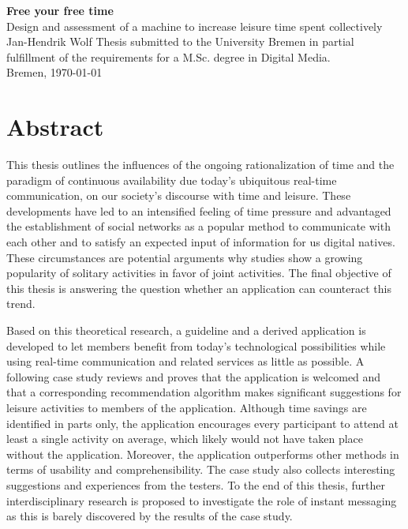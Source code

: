 \documentclass[12pt,numbers=noenddot,parskip,bibliography=totocnumbered,listof=totocnumbered,draft]{scrreprt}
\begin{document}
\begin{titlepage}
\null
\vfill

\Huge\textbf{Free your free time}
\bigskip\\
\LARGE{Design and assessment of a machine to increase leisure time spent collectively} %
\medskip\\
\Large{Jan-Hendrik Wolf}
\vfill
\vfill
\vfill
\small{Thesis submitted to the University Bremen in partial fulfillment of the requirements for a M.Sc. degree in Digital Media.\\
Bremen, \today}
\end{titlepage}


\tableofcontents

\chapter*{Abstract}
This thesis outlines the influences of the ongoing rationalization of time and the paradigm of continuous availability due today's ubiquitous real-time communication, on our society's discourse with time and leisure. These developments have led to an intensified feeling of time pressure and advantaged the establishment of social networks as a popular method to communicate with each other and to satisfy an expected input of information for us digital natives. These circumstances are potential arguments why studies show a growing popularity of solitary activities in favor of joint activities. The final objective of this thesis is answering the question whether an application can counteract this trend. 

Based on this theoretical research, a guideline and a derived application is developed to let members benefit from today's technological possibilities while using real-time communication and related services as little as possible. A following case study reviews and proves that the application is welcomed and that a corresponding recommendation algorithm makes significant suggestions for leisure activities to members of the application. Although time savings are identified in parts only, the application encourages every participant to attend at least a single activity on average, which likely would not have taken place without the application. Moreover, the application outperforms other methods in terms of usability and comprehensibility. The case study also collects interesting suggestions and experiences from the testers. To the end of this thesis, further interdisciplinary research is proposed to investigate the role of instant messaging as this is barely discovered by the results of the case study.
\end{document}
